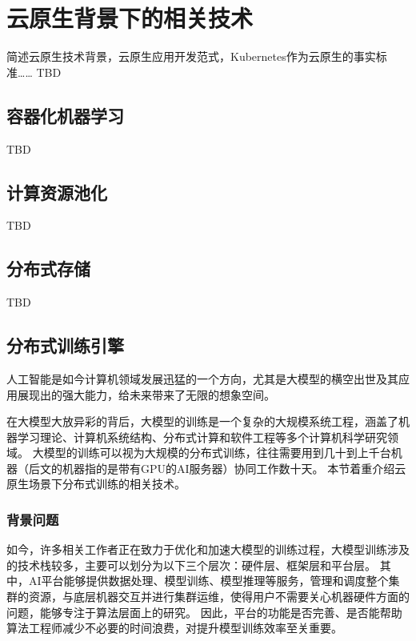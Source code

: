 
\chapter{云原生背景下的相关技术}

简述云原生技术背景，云原生应用开发范式，Kubernetes作为云原生的事实标准……
TBD


\section{容器化机器学习}

TBD


\section{计算资源池化}

TBD


\section{分布式存储}

TBD


\section{分布式训练引擎}

人工智能是如今计算机领域发展迅猛的一个方向，尤其是大模型的横空出世及其应用展现出的强大能力，给未来带来了无限的想象空间。

在大模型大放异彩的背后，大模型的训练是一个复杂的大规模系统工程，涵盖了机器学习理论、计算机系统结构、分布式计算和软件工程等多个计算机科学研究领域。
大模型的训练可以视为大规模的分布式训练，往往需要用到几十到上千台机器（后文的机器指的是带有GPU的AI服务器）协同工作数十天。
本节着重介绍云原生场景下分布式训练的相关技术。

\subsection{背景问题}
如今，许多相关工作者正在致力于优化和加速大模型的训练过程，大模型训练涉及的技术栈较多，主要可以划分为以下三个层次：硬件层、框架层和平台层。
其中，AI平台能够提供数据处理、模型训练、模型推理等服务，管理和调度整个集群的资源，与底层机器交互并进行集群运维，使得用户不需要关心机器硬件方面的问题，能够专注于算法层面上的研究。
因此，平台的功能是否完善、是否能帮助算法工程师减少不必要的时间浪费，对提升模型训练效率至关重要。

